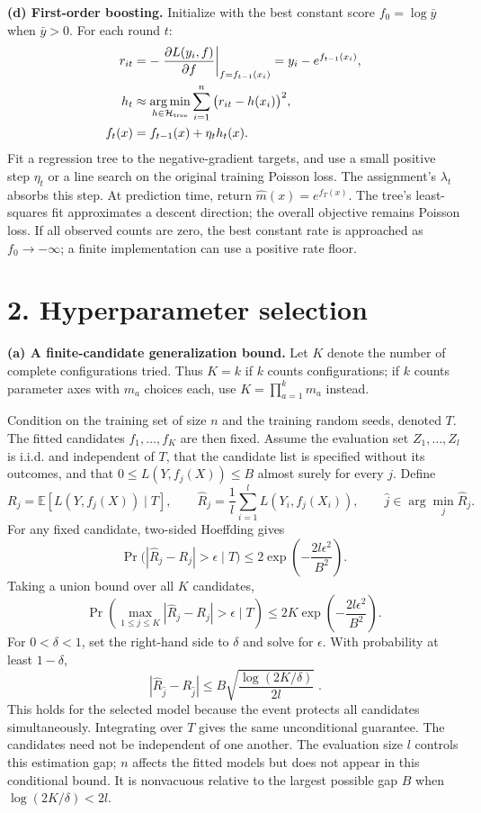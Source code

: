 \documentclass[10pt,letterpaper]{article}
\newcommand{\E}{\mathbb E}
\begin{document}
\textbf{(d) First-order boosting.}
Initialize with the best constant score $f_0=\log\bar y$ when $\bar y>0$. For each round $t$:
\begin{align*}
 r_{it}&=-\left.\frac{\partial L(y_i,f)}{\partial f}\right|_{f=f_{t-1}(x_i)}
       =y_i-e^{f_{t-1}(x_i)},\\
 h_t&\approx\underset{h\in\mathcal H_{\rm tree}}{\arg\min}
          \sum_{i=1}^n\big(r_{it}-h(x_i)\big)^2,\\
 f_t(x)&=f_{t-1}(x)+\eta_t h_t(x).
\end{align*}
Fit a regression tree to the negative-gradient targets, and use a small positive step $\eta_t$ or a line search on the original training Poisson loss. The assignment's $\lambda_t$ absorbs this step. At prediction time, return $\widehat m(x)=e^{f_T(x)}$. The tree's least-squares fit approximates a descent direction; the overall objective remains Poisson loss. If all observed counts are zero, the best constant rate is approached as $f_0\to-\infty$; a finite implementation can use a positive rate floor.

\newpage
\section*{2. Hyperparameter selection}
\textbf{(a) A finite-candidate generalization bound.}
Let $K$ denote the number of complete configurations tried. Thus $K=k$ if $k$ counts configurations; if $k$ counts parameter axes with $m_a$ choices each, use $K=\prod_{a=1}^k m_a$ instead.

Condition on the training set of size $n$ and the training random seeds, denoted $T$. The fitted candidates $f_1,\ldots,f_K$ are then fixed. Assume the evaluation set $Z_1,\ldots,Z_l$ is i.i.d. and independent of $T$, that the candidate list is specified without its outcomes, and that $0\le L(Y,f_j(X))\le B$ almost surely for every $j$. Define
\[
R_j=\E[L(Y,f_j(X))\mid T],\qquad
\widehat R_j=\frac1l\sum_{i=1}^l L(Y_i,f_j(X_i)),\qquad
\hat j\in\arg\min_j\widehat R_j.
\]
For any fixed candidate, two-sided Hoeffding gives
\[
\Pr\big(|\widehat R_j-R_j|>\epsilon\mid T\big)
\le 2\exp\!\left(-\frac{2l\epsilon^2}{B^2}\right).
\]
Taking a union bound over all $K$ candidates,
\[
\Pr\!\left(\max_{1\le j\le K}|\widehat R_j-R_j|>\epsilon\mid T\right)
\le 2K\exp\!\left(-\frac{2l\epsilon^2}{B^2}\right).
\]
For $0<\delta<1$, set the right-hand side to $\delta$ and solve for $\epsilon$. With probability at least $1-\delta$,
\[
\boxed{\;|\widehat R_{\hat j}-R_{\hat j}|\le
B\sqrt{\frac{\log(2K/\delta)}{2l}}\;}.
\]
This holds for the selected model because the event protects all candidates simultaneously. Integrating over $T$ gives the same unconditional guarantee. The candidates need not be independent of one another. The evaluation size $l$ controls this estimation gap; $n$ affects the fitted models but does not appear in this conditional bound. It is nonvacuous relative to the largest possible gap $B$ when $\log(2K/\delta)<2l$.
\end{document}
